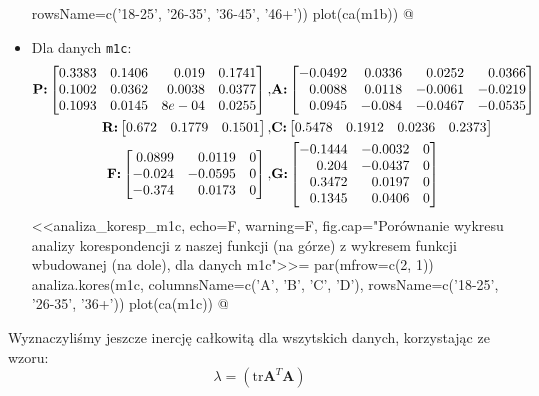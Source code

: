 \documentclass[12pt]{mwart}
\begin{document}
\begin{itemize}[label=$\bullet$]
  	                rowsName=c('18-25', '26-35', '36-45', '46+'))
  	  plot(ca(m1b))
  	@
    \item Dla danych \verb|m1c|:
    \begin{align}
		  \text{\textbf{P:}}
		  \begin{bmatrix*}[r]
				0.3383 & 0.1406 & 0.019 & 0.1741 \\
				0.1002 & 0.0362 & 0.0038 & 0.0377 \\
				0.1093 & 0.0145 & 8e-04 & 0.0255
		\end{bmatrix*}, &
      \text{\textbf{A:}}
      \begin{bmatrix*}[r]
			-0.0492 &  0.0336&  0.0252 &  0.0366 \\
			0.0088 &  0.0118 & -0.0061 & -0.0219 \\
			0.0945 & -0.084 & -0.0467 & -0.0535
			\end{bmatrix*} \\
      \text{\textbf{R:}}
      \begin{bmatrix*}[r]
      0.672 & 0.1779 & 0.1501
      \end{bmatrix*}, &
      \text{\textbf{C:}}
      \begin{bmatrix*}[r]
      0.5478 & 0.1912 & 0.0236 & 0.2373
      \end{bmatrix*} \\
      \text{\textbf{F:}}
      \begin{bmatrix*}[r]
		0.0899 &  0.0119 & 0 \\
			-0.024 & -0.0595 & 0 \\
			-0.374 &  0.0173 & 0
	\end{bmatrix*}, &
      \text{\textbf{G:}}
      \begin{bmatrix*}[r]
				-0.1444 & -0.0032 & 0 \\
				0.204 & -0.0437 & 0 \\
				0.3472 &  0.0197 & 0 \\
				0.1345&  0.0406 & 0
			\end{bmatrix*}
  \end{align}
  <<analiza_koresp_m1c, echo=F, warning=F, fig.cap="Porównanie wykresu analizy korespondencji z naszej funkcji (na górze) z wykresem funkcji wbudowanej (na dole), dla danych m1c">>=
  par(mfrow=c(2, 1))
	  analiza.kores(m1c, columnsName=c('A', 'B', 'C', 'D'), 
	                rowsName=c('18-25', '26-35', '36+'))
	  plot(ca(m1c))
	@
\end{itemize}
Wyznaczyliśmy jeszcze inercję całkowitą dla wszytskich danych, korzystając ze wzoru:
\begin{equation}\label{eq:inercja}
	\lambda=\left(\text{tr}\mathbf{A}^T\mathbf{A}\right)
\end{equation}
\end{document}

